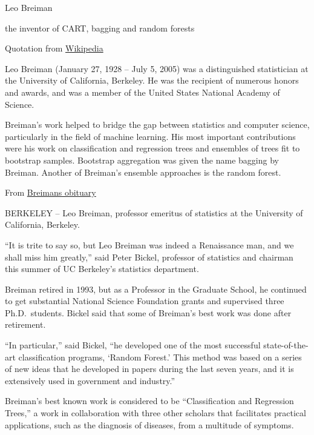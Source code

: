\documentclass[
  ignorenonframetext,
]{beamer}
\begin{document}
\begin{frame}

\begin{block}{Leo Breiman}

the inventor of CART, bagging and random forests

Quotation from
\href{https://en.wikipedia.org/wiki/Leo_Breiman}{Wikipedia}

Leo Breiman (January 27, 1928 -- July 5, 2005) was a distinguished
statistician at the University of California, Berkeley. He was the
recipient of numerous honors and awards, and was a member of the United
States National Academy of Science.

Breiman's work helped to bridge the gap between statistics and computer
science, particularly in the field of machine learning. His most
important contributions were his work on classification and regression
trees and ensembles of trees fit to bootstrap samples. Bootstrap
aggregation was given the name bagging by Breiman. Another of Breiman's
ensemble approaches is the random forest.

From
\href{https://www.berkeley.edu/news/media/releases/2005/07/07_breiman.shtml}{Breimans
obituary}

BERKELEY -- Leo Breiman, professor emeritus of statistics at the
University of California, Berkeley.

``It is trite to say so, but Leo Breiman was indeed a Renaissance man,
and we shall miss him greatly,'' said Peter Bickel, professor of
statistics and chairman this summer of UC Berkeley's statistics
department.

Breiman retired in 1993, but as a Professor in the Graduate School, he
continued to get substantial National Science Foundation grants and
supervised three Ph.D.~students. Bickel said that some of Breiman's best
work was done after retirement.

``In particular,'' said Bickel, ``he developed one of the most
successful state-of-the-art classification programs, `Random Forest.'
This method was based on a series of new ideas that he developed in
papers during the last seven years, and it is extensively used in
government and industry.''

Breiman's best known work is considered to be ``Classification and
Regression Trees,'' a work in collaboration with three other scholars
that facilitates practical applications, such as the diagnosis of
diseases, from a multitude of symptoms.

\end{block}

\end{frame}
\end{document}
